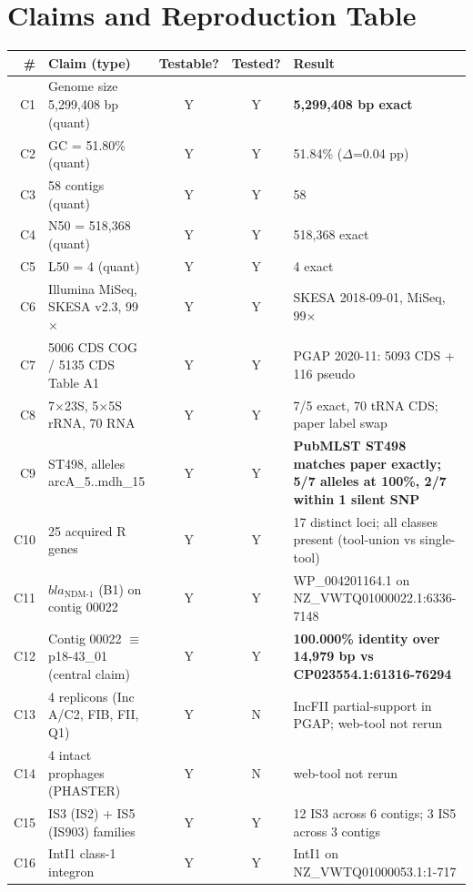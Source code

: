 \documentclass[11pt]{article}
\begin{document}
\section{Claims and Reproduction Table}

\begin{longtable}{@{}rp{6.5cm}ccp{4cm}@{}}
\toprule
\# & Claim (type) & Testable? & Tested? & Result \\
\midrule
C1  & Genome size 5,299,408 bp (quant)       & Y & Y & \textbf{5{,}299{,}408 bp exact} \\
C2  & GC = 51.80\% (quant)                   & Y & Y & 51.84\% ($\Delta$=0.04 pp) \\
C3  & 58 contigs (quant)                     & Y & Y & 58 \\
C4  & N50 = 518{,}368 (quant)                & Y & Y & 518{,}368 exact \\
C5  & L50 = 4 (quant)                        & Y & Y & 4 exact \\
C6  & Illumina MiSeq, SKESA v2.3, 99$\times$ & Y & Y & SKESA 2018-09-01, MiSeq, 99$\times$ \\
C7  & 5006 CDS COG / 5135 CDS Table A1       & Y & Y & PGAP 2020-11: 5093 CDS + 116 pseudo \\
C8  & 7$\times$23S, 5$\times$5S rRNA, 70 RNA & Y & Y & 7/5 exact, 70 tRNA CDS; paper label swap \\
C9  & ST498, alleles arcA\_5..mdh\_15        & Y & Y & \textbf{PubMLST ST498 matches paper exactly; 5/7 alleles at 100\%, 2/7 within 1 silent SNP} \\
C10 & 25 acquired R genes                    & Y & Y & 17 distinct loci; all classes present (tool-union vs single-tool) \\
C11 & $bla_{\text{NDM-1}}$ (B1) on contig 00022 & Y & Y & WP\_004201164.1 on NZ\_VWTQ01000022.1:6336-7148 \\
C12 & Contig 00022 $\equiv$ p18-43\_01 (central claim) & Y & Y & \textbf{100.000\% identity over 14{,}979 bp vs CP023554.1:61316-76294} \\
C13 & 4 replicons (Inc A/C2, FIB, FII, Q1)   & Y & N & IncFII partial-support in PGAP; web-tool not rerun \\
C14 & 4 intact prophages (PHASTER)           & Y & N & web-tool not rerun \\
C15 & IS3 (IS2) + IS5 (IS903) families       & Y & Y & 12 IS3 across 6 contigs; 3 IS5 across 3 contigs \\
C16 & IntI1 class-1 integron                 & Y & Y & IntI1 on NZ\_VWTQ01000053.1:1-717 \\

\end{longtable}
\end{document}
